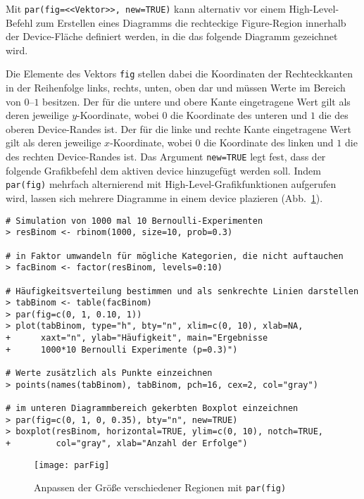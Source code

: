 Mit \lstinline!par(fig=<<Vektor>>, new=TRUE)! kann alternativ vor einem High-Level-Befehl zum Erstellen eines Diagramms die rechteckige Figure-Region innerhalb der Device-Fläche definiert werden, in die das folgende Diagramm gezeichnet wird.

Die Elemente des Vektors \lstinline!fig! stellen dabei die Koordinaten der Rechteckkanten in der Reihenfolge links, rechts, unten, oben dar und müssen Werte im Bereich von $0$--$1$ besitzen. Der für die untere und obere Kante eingetragene Wert gilt als deren jeweilige $y$-Koordinate, wobei $0$ die Koordinate des unteren und $1$ die des oberen Device-Randes ist. Der für die linke und rechte Kante eingetragene Wert gilt als deren jeweilige $x$-Koordinate, wobei $0$ die Koordinate des linken und $1$ die des rechten Device-Randes ist. Das Argument \lstinline!new=TRUE! legt fest, dass der folgende Grafikbefehl dem aktiven device hinzugefügt werden soll. Indem \lstinline!par(fig)! mehrfach alternierend mit High-Level-Grafikfunktionen aufgerufen wird, lassen sich mehrere Diagramme in einem device plazieren (Abb.\ \ref{fig:parFig}).
\begin{lstlisting}
# Simulation von 1000 mal 10 Bernoulli-Experimenten
> resBinom <- rbinom(1000, size=10, prob=0.3)

# in Faktor umwandeln für mögliche Kategorien, die nicht auftauchen
> facBinom <- factor(resBinom, levels=0:10)

# Häufigkeitsverteilung bestimmen und als senkrechte Linien darstellen
> tabBinom <- table(facBinom)
> par(fig=c(0, 1, 0.10, 1))
> plot(tabBinom, type="h", bty="n", xlim=c(0, 10), xlab=NA,
+      xaxt="n", ylab="Häufigkeit", main="Ergebnisse
+      1000*10 Bernoulli Experimente (p=0.3)")

# Werte zusätzlich als Punkte einzeichnen
> points(names(tabBinom), tabBinom, pch=16, cex=2, col="gray")

# im unteren Diagrammbereich gekerbten Boxplot einzeichnen
> par(fig=c(0, 1, 0, 0.35), bty="n", new=TRUE)
> boxplot(resBinom, horizontal=TRUE, ylim=c(0, 10), notch=TRUE,
+         col="gray", xlab="Anzahl der Erfolge")
\end{lstlisting}

\begin{figure}[ht]
\centering
\texttt{[image: parFig]}
\vspace*{-1em}
\caption{Anpassen der Größe verschiedener Regionen mit \lstinline!par(fig)!}
\label{fig:parFig}
\end{figure}

